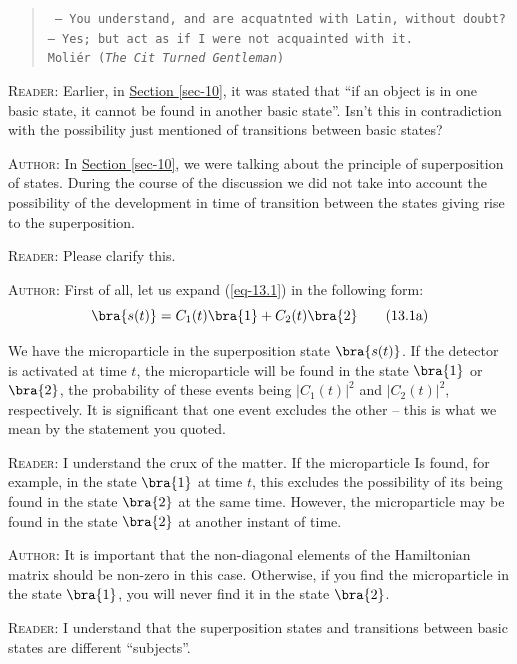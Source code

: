 \documentclass[a4paper,sfsidenotes,colorlinks=true]{tufte-book}
\numberwithin{equation}{section}
\numberwithin{figure}{section}
\begin{document}
\vspace*{10pt}
\begin{verse}
\texttt{\small
-- You understand, and are acquatnted with Latin, without doubt?\\
-- Yes; but act as if I were not acquainted with it.\\[5pt]
 Moli\'er (\emph{The Cit Turned Gentleman}) }
\end{verse}

\textsc{Reader}: Earlier, in \hyperref[sec-10]{Section \ref{sec-10}},
it was stated that ``if an object is in one basic state, it cannot be
found in another basic state''. Isn't this in contradiction with the
possibility just mentioned of transitions between basic states?

\textsc{Author}: In \hyperref[sec-10]{Section \ref{sec-10}}, we were
talking about the principle of superposition of states. During the
course of the discussion we did not take into account the possibility
of the development in time of transition between the states giving
rise to the superposition.

\textsc{Reader}: Please clarify this. 

\textsc{Author}: First of all, let us expand (\ref{eq-13.1}) in the following
form:
\begin{equation}
\bra{s(t)} = C_{1}(t) \bra{1} + C_{2}(t) \bra{2}
\tag{13.1a}
\label{eq-13.1a}
\end{equation}

We have the microparticle in the superposition state $\bra{s(t)}$. If
the detector is activated at time $t$, the microparticle will be found
in the state $\bra{1}$ or $\bra{2}$, the probability of these events
being $|C_{1}(t)|^{2}$ and $|C_{2}(t)|^{2}$, respectively. It is
significant that one event excludes the other -- this is what we mean
by the statement you quoted.

\textsc{Reader}: I understand the crux of the matter. If the
microparticle Is found, for example, in the state $\bra{1}$ at time
$t$, this excludes the possibility of its being found in the state
$\bra{2}$ at the same time. However, the microparticle may be found in
the state $\bra{2}$ at another instant of time.

\textsc{Author}: It is important that the non-diagonal elements of the
Hamiltonian matrix should be non-zero in this case. Otherwise, if you
find the microparticle in the state $\bra{1}$, you will never find it
in the state $\bra{2}$.

\textsc{Reader}: I understand that the superposition states and transitions
between basic states are different ``subjects''.  
\end{document}
